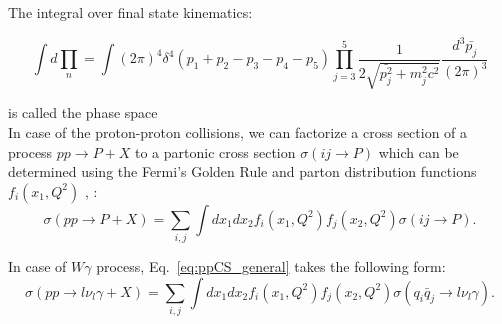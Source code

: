 The integral over final state kinematics:

\begin{equation}\label{eq:FermiGoldenRule}
\int d \prod_n =  \int (2\pi)^4 \delta^4(p_1+p_2-p_3-p_4-p_5) \prod_{j=3}^{5} \frac{1}{2 \sqrt{\bar{p_j^2}+m_j^2 c^2}}\frac{d^3\bar{p_j}}{(2\pi)^3}  
\end{equation}

is called the phase space \cite{ref_Peskin}\\



In case of the proton-proton collisions, we can factorize a cross section of a process $pp \rightarrow P+X$ to a partonic cross section $\sigma(ij \rightarrow P)$ which can be determined using the Fermi's Golden Rule and parton distribution functions $f_i(x_1,Q^2)$ \cite{ref_PDG}, \cite{ref_Lindsey_thesis}:\\

\begin{equation}\label{eq:ppCS_general}
  \sigma(pp \rightarrow P+X)= \sum_{i,j} \int dx_1 dx_2 f_i(x_1,Q^2) f_j(x_2, Q^2) \sigma(ij \rightarrow P).
\end{equation}

In case of $W\gamma$ process, Eq.~\ref{eq:ppCS_general} takes the following form: \\

\begin{equation}\label{eq:ppCS_Wg}
  \sigma(pp \rightarrow l \nu_l \gamma + X)= \sum_{i,j} \int dx_1 dx_2 f_i(x_1,Q^2) f_j(x_2, Q^2) \sigma(q_i \bar{q}_j \rightarrow l \nu_l \gamma).
\end{equation}

